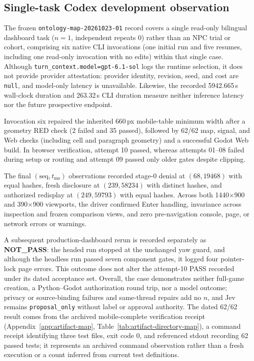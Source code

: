 \documentclass[journal]{IEEEtran}
\begin{document}
\subsection{Single-task Codex development observation}\label{sec:development-case}
The frozen \texttt{ontology-map-20261023-01} record covers a single read-only bilingual dashboard task ($n{=}1$, independent repeats $0$) rather than an NPC trial or cohort, comprising six native CLI invocations (one initial run and five resumes, including one read-only invocation with no edits) within that single case. Although \texttt{turn\_context.model=gpt-6.1-sol} logs the runtime selection, it does not provide provider attestation: provider identity, revision, seed, and cost are \texttt{null}, and model-only latency is unavailable. Likewise, the recorded 5942.665\,s wall-clock duration and 263.32\,s CLI duration measure neither inference latency nor the future prospective endpoint.

Invocation six repaired the inherited 660\,px mobile-table minimum width after a geometry RED check (2 failed and 35 passed), followed by 62/62 map, signal, and Web checks (including cell and paragraph geometry) and a successful Godot Web build. In browser verification, attempt 10 passed, whereas attempts 01--08 failed during setup or routing and attempt 09 passed only older gates despite clipping.

The final $(\text{seq},t_{\mathrm{ms}})$ observations recorded stage-$0$ denial at $(68,19468)$ with equal hashes, fresh disclosure at $(239,58234)$ with distinct hashes, and authorized redisplay at $(249,59793)$ with equal hashes. Across both 1440$\times$900 and 390$\times$900 viewports, the driver confirmed Enter handling, invariance across inspection and frozen comparison views, and zero pre-navigation console, page, or network errors or warnings.

A subsequent production-dashboard rerun is recorded separately as \textbf{NOT\_PASS}: the headed run stopped at the unchanged yaw guard, and although the headless run passed seven component gates, it logged four pointer-lock page errors. This outcome does not alter the attempt-10 PASS recorded under its dated acceptance set. Overall, the case demonstrates neither full-game creation, a Python--Godot authorization round trip, nor a model outcome; privacy or source-binding failures and same-thread repairs add no $n$, and Jev remains \texttt{proposal\_only} without label or approval authority.
The dated 62/62 result comes from the archived mobile-complete verification receipt (Appendix~\ref{app:artifact-map}, Table~\ref{tab:artifact-directory-map}), a command receipt identifying three test files, exit code 0, and referenced stdout recording 62 passed tests; it represents an archived command observation rather than a fresh execution or a count inferred from current test definitions.
\end{document}
